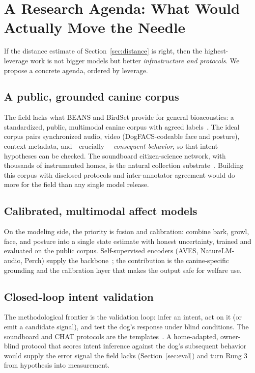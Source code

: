 \section{A Research Agenda: What Would Actually Move the Needle}
\label{sec:future}

If the distance estimate of Section~\ref{sec:distance} is right, then the
highest-leverage work is not bigger models but better \emph{infrastructure
and protocols}. We propose a concrete agenda, ordered by leverage.

\subsection{A public, grounded canine corpus}
The field lacks what BEANS and BirdSet provide for general bioacoustics: a
standardized, public, multimodal canine corpus with agreed
labels~\cite{hagiwara2023beans}. The ideal corpus pairs synchronized audio,
video (DogFACS-codeable face and posture), context metadata, and---crucially%
---\emph{consequent behavior}, so that intent hypotheses can be checked. The
soundboard citizen-science network, with thousands of instrumented homes,
is the natural collection substrate~\cite{bastos2024plos}. Building this
corpus with disclosed protocols and inter-annotator agreement would do more
for the field than any single model release.

\subsection{Calibrated, multimodal affect models}
On the modeling side, the priority is fusion and calibration: combine bark,
growl, face, and posture into a single state estimate with honest
uncertainty, trained and evaluated on the public corpus. Self-supervised
encoders (AVES, NatureLM-audio, Perch) supply the
backbone~\cite{hagiwara2023aves,robinson2024naturelm,ghani2023perch}; the
contribution is the canine-specific grounding and the calibration layer
that makes the output safe for welfare use.

\subsection{Closed-loop intent validation}
The methodological frontier is the validation loop: infer an intent, act on
it (or emit a candidate signal), and test the dog's response under blind
conditions. The soundboard and CHAT protocols are the
templates~\cite{bastos2024scirep,google2025dolphingemma}. A home-adapted,
owner-blind protocol that scores intent inference against the dog's
subsequent behavior would supply the error signal the field lacks
(Section~\ref{sec:eval}) and turn Rung 3 from hypothesis into measurement.

